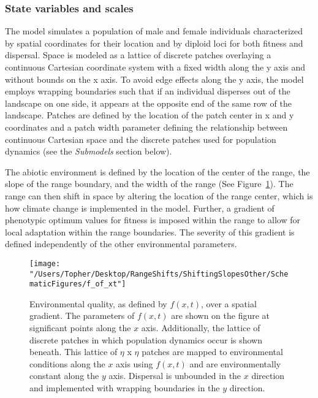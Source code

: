 \documentclass[11pt, oneside]{article}
\begin{document}
\subsubsection{State variables and scales}
The model simulates a population of male and female individuals characterized by spatial coordinates for their location and by diploid loci for both fitness and dispersal. Space is modeled as a lattice of discrete patches overlaying a continuous Cartesian coordinate system with a fixed width along the y axis and without bounds on the x axis. To avoid edge effects along the y axis, the model employs wrapping boundaries such that if an individual disperses out of the landscape on one side, it appears at the opposite end of the same row of the landscape. Patches are defined by the location of the patch center in x and y coordinates and a patch width parameter defining the relationship between continuous Cartesian space and the discrete patches used for population dynamics (see the \textit{Submodels} section below). 

The abiotic environment is defined by the location of the center of the range, the slope of the range boundary, and the width of the range (See Figure~\ref{fig:EnvFunction}). The range can then shift in space by altering the location of the range center, which is how climate change is implemented in the model. Further, a gradient of phenotypic optimum values for fitness is imposed within the range to allow for local adaptation within the range boundaries. The severity of this gradient is defined independently of the other environmental parameters.

\begin{figure}
\centering
\texttt{[image: "/Users/Topher/Desktop/RangeShifts/ShiftingSlopesOther/SchematicFigures/f\_of\_xt"]}
\vspace{-5mm}
\caption[LoF entry]{Environmental quality, as defined by $f(x,t)$, over a spatial gradient. The parameters of $f(x,t)$ are shown on the figure at significant points along the $x$ axis. Additionally, the lattice of discrete patches in which population dynamics occur is shown beneath. This lattice of $\eta$ x $\eta$ patches are mapped to environmental conditions along the $x$ axis using $f(x,t)$ and are environmentally constant along the $y$ axis. Dispersal is unbounded in the $x$ direction and implemented with wrapping boundaries in the $y$ direction.}
\label{fig:EnvFunction}
\end{figure}
\end{document}
